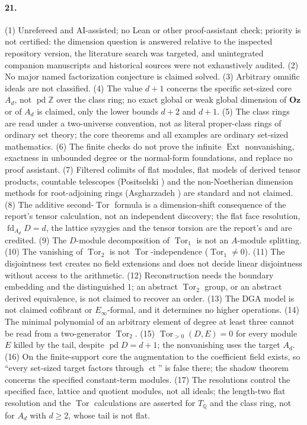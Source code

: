 \documentclass[11pt,letterpaper]{article}
\numberwithin{equation}{section}
\theoremstyle{definition}
\theoremstyle{remark}
\theoremstyle{plain}
\newcommand{\Oz}{\mathbf{Oz}}
\newcommand{\Z}{\mathbb Z}
\newcommand{\Q}{\mathbb Q}
\newcommand{\ct}{\operatorname{ct}}
\newcommand{\Tor}{\operatorname{Tor}}
\newcommand{\Ext}{\operatorname{Ext}}
\newcommand{\pd}{\operatorname{pd}}
\newcommand{\fd}{\operatorname{fd}}
\begin{document}
\paragraph{21.} (1) Unrefereed and AI-assisted; no Lean or other proof-assistant check; priority is not certified: the dimension question
is answered relative to the inspected repository version, the literature search was targeted, and unintegrated companion manuscripts and
historical sources were not exhaustively audited. (2) No major named factorization conjecture is claimed solved. (3) Arbitrary omnific
ideals are not classified. (4) The value $d+1$ concerns the specific set-sized core $A_d$, not $\pd\Z$ over the class ring; no exact global
or weak global dimension of $\Oz$ or of $A_d$ is claimed, only the lower bounds $d+2$ and $d+1$. (5) The class rings are read under a
two-universe convention, not as literal proper-class rings of ordinary set theory; the core theorems and all examples are ordinary
set-sized mathematics. (6) The finite checks do not prove the infinite $\Ext$ nonvanishing, exactness in unbounded degree or the
normal-form foundations, and replace no proof assistant. (7) Filtered colimits of flat modules, flat models of derived tensor products,
countable telescopes (Positselski \cite{Positselski}) and the non-Noetherian dimension methods for root-adjoining rings (Asgharzadeh
\cite{Asgharzadeh}) are standard and not claimed. (8) The additive second-$\Tor$ formula is a dimension-shift consequence of the report's
tensor calculation, not an independent discovery; the flat face resolution, $\fd_{A_d}D=d$, the lattice syzygies and the tensor torsion are
the report's and are credited. (9) The $D$-module decomposition of $\Tor_1$ is not an $A$-module splitting. (10) The vanishing of $\Tor_2$
is not $\Tor$-independence ($\Tor_1\ne0$). (11) The disjointness test creates no field extensions and does not decide linear disjointness
without access to the arithmetic. (12) Reconstruction needs the boundary embedding and the distinguished $1$; an abstract $\Tor_2$ group, or
an abstract derived equivalence, is not claimed to recover an order. (13) The DGA model is not claimed cofibrant or $E_\infty$-formal, and
it determines no higher operations. (14) The minimal polynomial of an arbitrary element of degree at least three cannot be read from a
two-generator $\Tor_2$. (15) $\Tor_{>0}(D,E)=0$ for every module $E$ killed by the tail, despite $\pd D=d+1$; the nonvanishing uses the
target $A_d$. (16) On the finite-support core the augmentation to the coefficient field exists, so ``every set-sized target factors through
$\ct$'' is false there; the shadow theorem concerns the specified constant-term modules. (17) The resolutions control the specified face,
lattice and quotient modules, not all ideals; the length-two flat resolution and the $\Tor$ calculations are asserted for $T_\Q$ and the
class ring, not for $A_d$ with $d\ge2$, whose tail is not flat.
\end{document}
